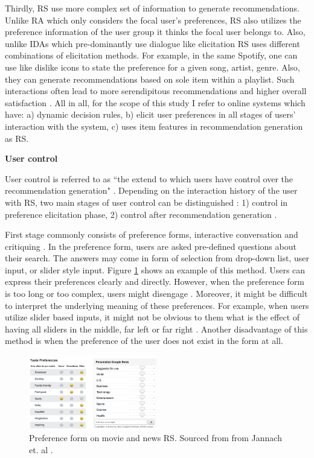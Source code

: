 \documentclass[a4paper,12pt]{article}
\newcommand{\citeyearonly}[1]{\citeyearpar{#1}}
\begin{document}
Thirdly, RS use more complex set of information to generate recommendations. Unlike RA which only considers the focal user's preferences, RS also utilizes the preference information of the user group it thinks the focal user belongs to. Also, unlike IDAs which pre-dominantly use dialogue like elicitation RS uses different combinations of elicitation methods. For example, in the same Spotify, one can use like dislike icons to state the preference for a given song, artist, genre. Also, they can generate recommendations based on sole item within a playlist. Such interactions often lead to more serendipitous recommendations and higher overall satisfaction \citep{kotkovSurveySerendipityRecommender2016}. All in all, for the scope of this study I refer to online systems which have: a) dynamic decision rules, b) elicit user preferences in all stages of users' interaction with the system, c) uses item features in recommendation generation as RS.

\textbf{User control}

User control is referred to as ``the extend to which users have control over the recommendation generation" \citep{knijnenburgExplainingUserExperience2012}. Depending on the interaction history of the user with RS, two main stages of user control can be distinguished : 1) control in preference elicitation phase, 2) control after recommendation generation \citep{jannach2017user}.

First stage commonly consists of preference forms, interactive conversation and critiquing \citep{jannach2019explanations}. In the preference form, users are asked pre-defined questions about their search. The answers may come in form of selection from drop-down list, user input, or slider style input. Figure \ref{fig:preference} shows an example of this method. Users can express their preferences clearly and directly.  However, when the preference form is too long or too complex, users might disengage \citep{jannach2017user}. Moreover, it might be difficult to interpret the underlying meaning of these preferences. For example, when users utilize slider based inputs, it might not be obvious to them what is the effect of having all sliders in the middle, far left or far right \citep{jannach2017user}. Another disadvantage of this method is when the preference of the user does not exist in the form at all.

\begin{figure}[H]
    \centering
    \includegraphics[width=0.5\textwidth]{staticFiles/preferenceForm.png}
    \caption{Preference form on movie and news RS. Sourced from from Jannach et. al \citeyearonly{jannach2017user}.}
    \label{fig:preference}
\end{figure}
\end{document}
